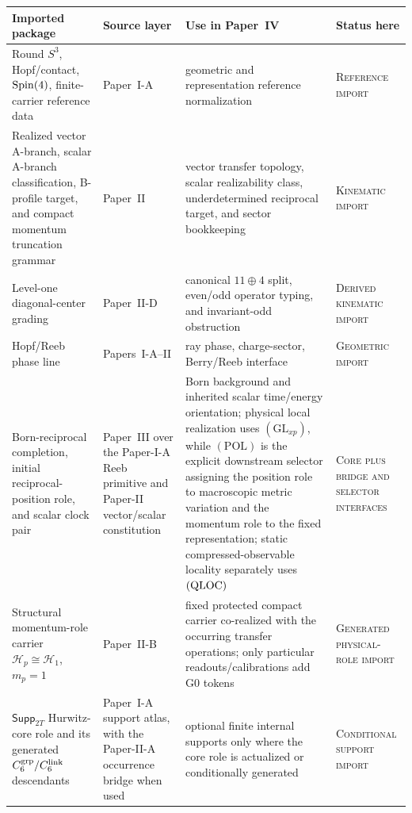 \documentclass[12pt,a4paper]{article}
\begin{document}
\begin{table}[H]
\centering
\scriptsize

\begingroup
\setlength{\tabcolsep}{3pt}
\renewcommand{\arraystretch}{1.16}
\begin{tabular}{@{}L{3.0cm}L{3.4cm}L{4.4cm}L{3.0cm}@{}}
\toprule
\textbf{Imported package} & \textbf{Source layer} & \textbf{Use in Paper~IV} & \textbf{Status here} \\
\midrule
Round \(S^3\), Hopf/contact, \(\mathrm{Spin}(4)\), finite-carrier reference data & Paper~I-A & geometric and representation reference normalization & \textsc{Reference import} \\
Realized vector A-branch, scalar A-branch classification, B-profile target, and compact momentum truncation grammar & Paper~II & vector transfer topology, scalar realizability class, underdetermined reciprocal target, and sector bookkeeping & \textsc{Kinematic import} \\
Level-one diagonal-center grading & Paper~II-D & canonical
\(11\oplus4\) split, even/odd operator typing, and invariant-odd obstruction
& \textsc{Derived kinematic import} \\
Hopf/Reeb phase line & Papers~I-A--II & ray phase, charge-sector, Berry/Reeb interface & \textsc{Geometric import} \\
Born-reciprocal completion, initial reciprocal-position role, and scalar clock pair & Paper~III over the Paper-I-A Reeb primitive and Paper-II vector/scalar constitution & Born background and inherited scalar time/energy orientation; physical local realization uses \((\mathrm{GL}_{xp})\), while \((\mathrm{POL})\) is the explicit downstream selector assigning the position role to macroscopic metric variation and the momentum role to the fixed representation; static compressed-observable locality separately uses \(({\rm QLOC})\) & \textsc{Core plus bridge and selector interfaces} \\
Structural momentum-role carrier \(\mathcal H_p\cong\mathcal H_1\), \(m_p=1\) & Paper~II-B & fixed protected compact carrier co-realized with the occurring transfer operations; only particular readouts/calibrations add G0 tokens & \textsc{Generated physical-role import} \\
\(\mathsf{Supp}_{2T}\) Hurwitz-core role and its generated
\(C_6^{\rm grp}/C_6^{\rm link}\) descendants & Paper~I-A support atlas, with
the Paper-II-A occurrence bridge when used & optional finite internal
supports only where the core role is actualized or conditionally generated &
\textsc{Conditional support import} \\

\end{tabular}
\end{table}
\end{document}
